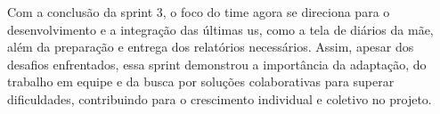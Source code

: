 Com a conclusão da sprint 3, o foco do time agora se direciona para o desenvolvimento e a integração das últimas \ac{us}, como a tela de diários da mãe, além da preparação e entrega dos relatórios necessários. Assim, apesar dos desafios enfrentados, essa sprint demonstrou a importância da adaptação, do trabalho em equipe e da busca por soluções colaborativas para superar dificuldades, contribuindo para o crescimento individual e coletivo no projeto.